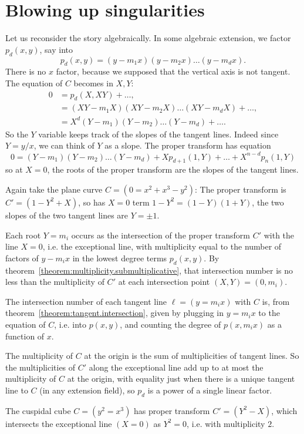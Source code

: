 \section{Blowing up singularities}
Let us reconsider the story algebraically.
In some algebraic extension, we factor \(p_d(x,y)\), say into
\[
p_d(x,y)=(y-m_1x)(y-m_2x)\dots(y-m_dx).
\]
There is no \(x\) factor, because we supposed that the vertical axis is not tangent.
The equation of \(C\) becomes in \(X,Y\):
\begin{align*}
0&=
p_d(X,XY)+\dots,
\\
&=
(XY-m_1X)(XY-m_2X)\dots(XY-m_dX)+\dots,
\\
&=
X^d(Y-m_1)(Y-m_2)\dots(Y-m_d)+\dots.
\end{align*}
So the \(Y\) variable keeps track of the slopes of the tangent lines.
Indeed since \(Y=y/x\), we can think of \(Y\) as a slope.
The proper transform has equation
\[
0=(Y-m_1)(Y-m_2)\dots(Y-m_d)+Xp_{d+1}(1,Y)+\dots+X^{n-d}p_n(1,Y)
\]
so at \(X=0\), the roots of the proper transform are the slopes of the tangent lines.
\begin{example}
Again take the plane curve \(C=(0=x^2+x^3-y^2)\):
The proper transform is \(C'=(1-Y^2+X)\), so has \(X=0\) term \(1-Y^2=(1-Y)(1+Y)\), the two slopes of the two tangent lines are \(Y=\pm 1\).
\end{example}
Each root \(Y=m_i\) occurs as the intersection of the proper transform \(C'\) with the line \(X=0\), i.e. the exceptional line, with multiplicity equal to the number of factors of \(y-m_ix\) in the lowest degree terms \(p_d(x,y)\).
By theorem~\vref{theorem:multiplicity.submultiplicative}, that intersection number is no less than the multiplicity of \(C'\) at each intersection point \((X,Y)=(0,m_i)\).

The intersection number of each tangent line \(\ell=(y=m_ix)\) with \(C\) is, from theorem~\vref{theorem:tangent.intersection}, given by plugging in \(y=m_ix\) to the equation of \(C\), i.e. into \(p(x,y)\), and counting the degree of \(p(x,m_ix)\) as a function of \(x\).

The multiplicity of \(C\) at the origin is the sum of multiplicities of tangent lines.
So the multiplicities of \(C'\) along the exceptional line add up to at most the multiplicity of \(C\) at the origin, with equality just when there is a unique tangent line to \(C\) (in any extension field), so \(p_d\) is a power of a single linear factor.
\begin{example}
The cuspidal cube \(C=(y^2=x^3)\)
has proper transform \(C'=(Y^2-X)\), which intersects the exceptional line \((X=0)\) as \(Y^2=0\), i.e. with multiplicity \(2\).
\end{example}

